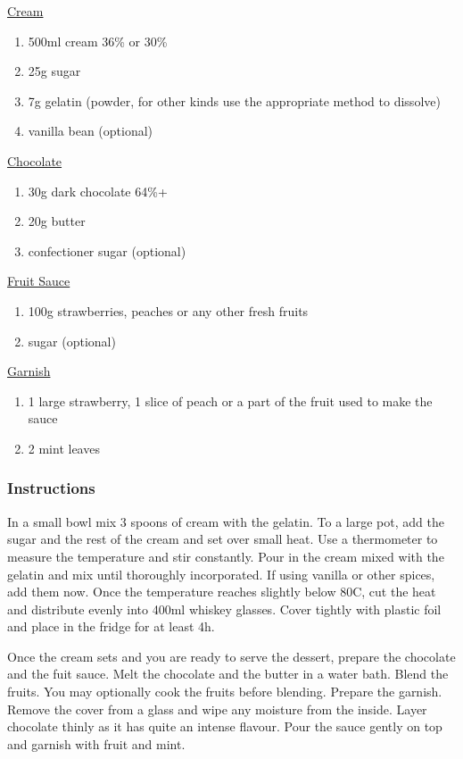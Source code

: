 \documentclass[11pt]{report}
\newcommand{\header}[1]{\subsubsection*{#1}}
\newcommand{\ingredientsection}[1]{\medskip\noindent\underline{#1}\medskip}
\begin{document}
\ingredientsection{Cream}
\begin{enumerate}
  \item 500ml cream 36\% or 30\%
  \item 25g sugar
  \item 7g gelatin (powder, for other kinds use the appropriate method to
  dissolve)
  \item vanilla bean (optional)
\end{enumerate}

\ingredientsection{Chocolate}
\begin{enumerate}
  \item 30g dark chocolate 64\%+
  \item 20g butter
  \item confectioner sugar (optional)
\end{enumerate}

\ingredientsection{Fruit Sauce}
\begin{enumerate}
  \item 100g strawberries, peaches or any other fresh fruits
  \item sugar (optional)
\end{enumerate}

\ingredientsection{Garnish}
\begin{enumerate}
  \item 1 large strawberry, 1 slice of peach or a part of the fruit used to
  make the sauce
  \item 2 mint leaves
\end{enumerate}

\header{Instructions}
In a small bowl mix 3 spoons of cream with the gelatin. To a large pot, add the
sugar and the rest of the cream and set over small heat. Use a thermometer to
measure the temperature and stir constantly. Pour in the cream mixed with the
gelatin and mix until thoroughly incorporated. If using vanilla or other
spices, add them now. Once the temperature reaches slightly below 80C, cut the
heat and distribute evenly into 400ml whiskey glasses. Cover tightly with
plastic foil and place in the fridge for at least 4h.

Once the cream sets and you are ready to serve the dessert, prepare the
chocolate and the fuit sauce. Melt the chocolate and the butter in a water
bath. Blend the fruits. You may optionally cook the fruits before blending.
Prepare the garnish. Remove the cover from a glass and wipe any moisture from
the inside. Layer chocolate thinly as it has quite an intense flavour. Pour the
sauce gently on top and garnish with fruit and mint.
\end{document}
